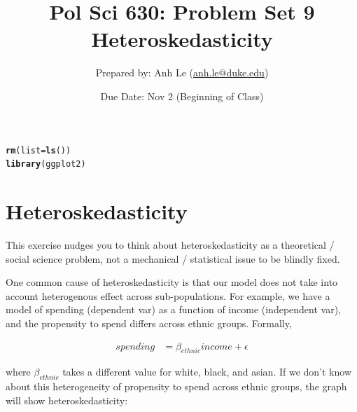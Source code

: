 \documentclass{article}\usepackage[]{graphicx}\usepackage[]{color}
\makeatletter
\newcommand{\hlstd}[1]{\textcolor[rgb]{0.345,0.345,0.345}{#1}}%
\newcommand{\hlkwc}[1]{\textcolor[rgb]{0.333,0.667,0.333}{#1}}%
\newcommand{\hlkwd}[1]{\textcolor[rgb]{0.737,0.353,0.396}{\textbf{#1}}}%
\newenvironment{kframe}{%
 \def\at@end@of@kframe{}%
 \ifinner\ifhmode%
  \def\at@end@of@kframe{\end{minipage}}%
  \begin{minipage}{\columnwidth}%
 \fi\fi%
 \def\FrameCommand##1{\hskip\@totalleftmargin \hskip-\fboxsep
 \colorbox{shadecolor}{##1}\hskip-\fboxsep
     \hskip-\linewidth \hskip-\@totalleftmargin \hskip\columnwidth}%
 \MakeFramed {\advance\hsize-\width
   \@totalleftmargin\z@ \linewidth\hsize
   \@setminipage}}%
 {\par\unskip\endMakeFramed%
 \at@end@of@kframe}
\newenvironment{knitrout}{}{} %
\makeatother
\begin{document}
\title{Pol Sci 630:  Problem Set 9 Heteroskedasticity}

\author{Prepared by: Anh Le (\href{mailto:anh.le@duke.edu}{anh.le@duke.edu})}

\date{Due Date: Nov 2 (Beginning of Class)}

\maketitle

\begin{knitrout}
\color{fgcolor}\begin{kframe}
\begin{alltt}
\hlkwd{rm}\hlstd{(}\hlkwc{list} \hlstd{=} \hlkwd{ls}\hlstd{())}
\hlkwd{library}\hlstd{(ggplot2)}
\end{alltt}
\end{kframe}
\end{knitrout}


\section{Heteroskedasticity}

This exercise nudges you to think about heteroskedasticity as a theoretical / social science problem, not a mechanical / statistical issue to be blindly fixed.

One common cause of heteroskedasticity is that our model does not take into account heterogenous effect across sub-populations. For example, we have a model of spending (dependent var) as a function of income (independent var), and the propensity to spend differs across ethnic groups. Formally,

\begin{align}
spending &= \beta_{ethnic} income + \epsilon
\end{align}

where $\beta_{ethnic}$ takes a different value for white, black, and asian. If we don't know about this heterogeneity of propensity to spend across ethnic groups, the graph will show heteroskedasticity:
\end{document}
